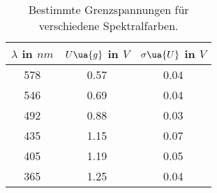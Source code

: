 \begin{table}
  \centering
  \label{tab:Spannungen}
  \caption{Bestimmte Grenzspannungen für verschiedene Spektralfarben.}
  \begin{tabular}{c c c}
    \toprule
    $\lambda$ in $\si{nm}$ & $U\ua{g}$ in $\si{V}$ & $\sigma\ua{U}$ in $\si{V}$ \\
    \midrule
    578 & 0.57 & 0.04 \\
    546 & 0.69 & 0.04 \\
    492 & 0.88 & 0.03 \\
    435 & 1.15 & 0.07 \\
    405 & 1.19 & 0.05 \\
    365 & 1.25 & 0.04 \\
    \bottomrule
  \end{tabular}
\end{table}
